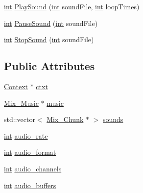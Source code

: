 \begin{DoxyCompactItemize}
\item 
\hyperlink{_s_d_l__thread_8h_a6a64f9be4433e4de6e2f2f548cf3c08e}{int} \hyperlink{class_audio_manager_a414c9ed8428eeefaf718e9471a2a0d2c}{Play\-Sound} (\hyperlink{_s_d_l__thread_8h_a6a64f9be4433e4de6e2f2f548cf3c08e}{int} sound\-File, \hyperlink{_s_d_l__thread_8h_a6a64f9be4433e4de6e2f2f548cf3c08e}{int} loop\-Times)
\item 
\hyperlink{_s_d_l__thread_8h_a6a64f9be4433e4de6e2f2f548cf3c08e}{int} \hyperlink{class_audio_manager_a7b13ea31e6278900ac81d977e69a44e5}{Pause\-Sound} (\hyperlink{_s_d_l__thread_8h_a6a64f9be4433e4de6e2f2f548cf3c08e}{int} sound\-File)
\item 
\hyperlink{_s_d_l__thread_8h_a6a64f9be4433e4de6e2f2f548cf3c08e}{int} \hyperlink{class_audio_manager_a21d6f2c07306a824f8404c1cad595fb4}{Stop\-Sound} (\hyperlink{_s_d_l__thread_8h_a6a64f9be4433e4de6e2f2f548cf3c08e}{int} sound\-File)
\end{DoxyCompactItemize}
\subsection*{Public Attributes}
\begin{DoxyCompactItemize}
\item 
\hyperlink{class_context}{Context} $\ast$ \hyperlink{class_audio_manager_a732e4905a8a05a0ae09e6250172daad1}{ctxt}
\item 
\hyperlink{_s_d_l__mixer_8h_a1d58ae8fa29e1c03df23baeffb32b14c}{Mix\-\_\-\-Music} $\ast$ \hyperlink{class_audio_manager_ac2db72d9907112162225826056ee7f11}{music}
\item 
std\-::vector$<$ \hyperlink{struct_mix___chunk}{Mix\-\_\-\-Chunk} $\ast$ $>$ \hyperlink{class_audio_manager_a2052962e50b4372aa9c0621f48e65e59}{sounds}
\item 
\hyperlink{_s_d_l__thread_8h_a6a64f9be4433e4de6e2f2f548cf3c08e}{int} \hyperlink{class_audio_manager_a6307e9ae3cd57d6d85adab5a9a4511c7}{audio\-\_\-rate}
\item 
\hyperlink{_s_d_l__thread_8h_a6a64f9be4433e4de6e2f2f548cf3c08e}{int} \hyperlink{class_audio_manager_a9fa300ed4663c81466bd3e21faf0ceb9}{audio\-\_\-format}
\item 
\hyperlink{_s_d_l__thread_8h_a6a64f9be4433e4de6e2f2f548cf3c08e}{int} \hyperlink{class_audio_manager_a616eba72f37260dc197a6171577bcd3d}{audio\-\_\-channels}
\item 
\hyperlink{_s_d_l__thread_8h_a6a64f9be4433e4de6e2f2f548cf3c08e}{int} \hyperlink{class_audio_manager_aa88d9c11671aaff4df98dfc3c0b64002}{audio\-\_\-buffers}
\end{DoxyCompactItemize}


